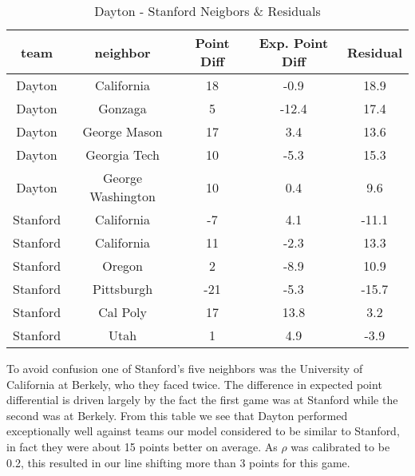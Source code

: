 \begin{table}[h!]
\caption{Dayton - Stanford Neigbors \& Residuals}
\small
\centering
\begin{tabular}{|c|cccc |}
   \hline
   \hline
 team & neighbor &  Point Diff& Exp. Point Diff & Residual \\
  \hline
Dayton & California & 18 & -0.9 & 18.9\\
Dayton & Gonzaga & 5 & -12.4 & 17.4\\
Dayton & George Mason& 17 & 3.4 & 13.6\\
Dayton &  Georgia Tech& 10 & -5.3 & 15.3\\
Dayton & George Washington& 10 & 0.4 & 9.6\\
\hline
Stanford & California&-7 & 4.1&-11.1 \\
Stanford & California &11 &-2.3 &13.3 \\
Stanford & Oregon&2 &-8.9 &10.9 \\
Stanford & Pittsburgh&-21 &-5.3 &-15.7 \\
Stanford & Cal Poly&17 &13.8 &3.2 \\
Stanford & Utah&1 &4.9 &-3.9 \\
   \hline
   \hline
\end{tabular}
\label{tab:DayStan}
\end{table}
To avoid confusion one of Stanford's five neighbors was the University of California at Berkely, who they faced twice.  The difference in expected point differential is driven largely by the fact the first game was at Stanford while the second was at Berkely. From this table we see that Dayton performed exceptionally well against teams our model considered to be similar to Stanford, in fact they were about 15 points better on average.  As $\rho$ was calibrated to be 0.2, this resulted in our line shifting more than 3 points for this game.
